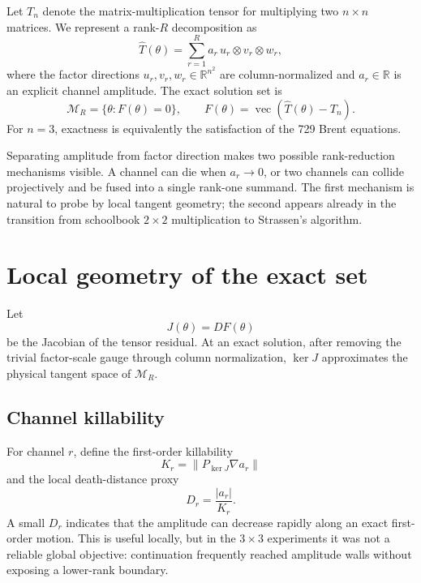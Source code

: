 \documentclass[11pt]{article}
\newcommand{\MR}{\mathcal{M}_R}
\newcommand{\RR}{\mathbb{R}}
\newcommand{\norm}[1]{\left\lVert #1 \right\rVert}
\begin{document}
Let $T_n$ denote the matrix-multiplication tensor for multiplying two $n\times n$ matrices.  We represent a rank-$R$ decomposition as
\begin{equation}
    \widehat T(\theta)
    = \sum_{r=1}^{R} a_r\,u_r\otimes v_r\otimes w_r,
\end{equation}
where the factor directions $u_r,v_r,w_r\in\RR^{n^2}$ are column-normalized and $a_r\in\RR$ is an explicit channel amplitude.  The exact solution set is
\begin{equation}
    \MR = \{\theta : F(\theta)=0\},
    \qquad
    F(\theta)=\operatorname{vec}(\widehat T(\theta)-T_n).
\end{equation}
For $n=3$, exactness is equivalently the satisfaction of the 729 Brent equations.

Separating amplitude from factor direction makes two possible rank-reduction mechanisms visible.  A channel can die when $a_r\to0$, or two channels can collide projectively and be fused into a single rank-one summand.  The first mechanism is natural to probe by local tangent geometry; the second appears already in the transition from schoolbook $2\times2$ multiplication to Strassen's algorithm.

\section{Local geometry of the exact set}

Let
\begin{equation}
    J(\theta)=DF(\theta)
\end{equation}
be the Jacobian of the tensor residual.  At an exact solution, after removing the trivial factor-scale gauge through column normalization, $\ker J$ approximates the physical tangent space of $\MR$.

\subsection{Channel killability}

For channel $r$, define the first-order killability
\begin{equation}
    K_r = \norm{P_{\ker J}\nabla a_r}
\end{equation}
and the local death-distance proxy
\begin{equation}
    D_r = \frac{|a_r|}{K_r}.
\end{equation}
A small $D_r$ indicates that the amplitude can decrease rapidly along an exact first-order motion.  This is useful locally, but in the $3\times3$ experiments it was not a reliable global objective: continuation frequently reached amplitude walls without exposing a lower-rank boundary.
\end{document}
